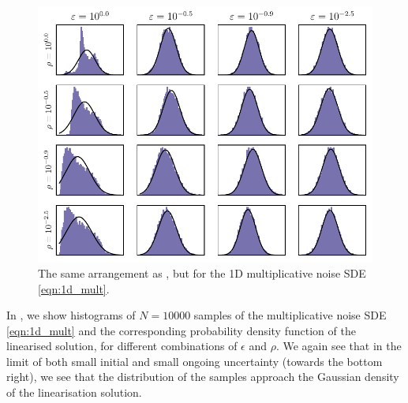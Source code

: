 \begin{figure}
	\begin{center}
		\includegraphics[width=\textwidth]{chp04_paper_numerics/figures/multiplicative/selected_hists.pdf}
		\caption{The same arrangement as , but for the 1D multiplicative noise SDE \cref{eqn:1d_mult}.}
		\label{fig:1d_mult_hists}
	\end{center}
\end{figure}

In , we show histograms of \(N = 10000\) samples of the multiplicative noise SDE \cref{eqn:1d_mult} and the corresponding probability density function of the linearised solution, for different combinations of \(\epsilon\) and \(\rho\).
We again see that in the limit of both small initial and small ongoing uncertainty (towards the bottom right), we see that the distribution of the samples approach the Gaussian density of the linearisation solution.


